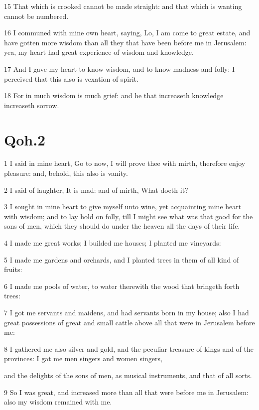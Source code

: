 \documentclass[12pt]{report}
\begin{document}
15 That which is crooked cannot be made straight: and that which
   is
   wanting cannot be numbered.
   
16 I communed with mine own heart, saying, Lo, I am come to great
   estate, and have gotten more wisdom than all they that have been
   before me in Jerusalem: yea, my heart had great experience of
   wisdom
   and knowledge.
   
17 And I gave my heart to know wisdom, and to know madness and
   folly: I perceived that this also is vexation of spirit.
   
18 For in much wisdom is much grief: and he that increaseth
   knowledge increaseth sorrow.

\section{Qoh.2}
   
   
1 I said in mine heart, Go to now, I will prove thee with mirth,
   therefore enjoy pleasure: and, behold, this also is vanity.
   
2 I said of laughter, It is mad: and of mirth, What doeth it?
   
3 I sought in mine heart to give myself unto wine, yet
   acquainting
   mine heart with wisdom; and to lay hold on folly, till I might see
   what was that good for the sons of men, which they should do under
   the
   heaven all the days of their life.
   
4 I made me great works; I builded me houses; I planted me
   vineyards:
   
5 I made me gardens and orchards, and I planted trees in them of
   all
   kind of fruits:
   
6 I made me pools of water, to water therewith the wood that
   bringeth forth trees:
   
7 I got me servants and maidens, and had servants born in my
   house;
   also I had great possessions of great and small cattle above all
   that
   were in Jerusalem before me:
   
8 I gathered me also silver and gold, and the peculiar treasure
   of
   kings and of the provinces: I gat me men singers and women singers,
   
   and the delights of the sons of men, as musical instruments, and
   that
   of all sorts. 
   
9 So I was great, and increased more than all that were before me
   in
   Jerusalem: also my wisdom remained with me.
   
\end{document}
